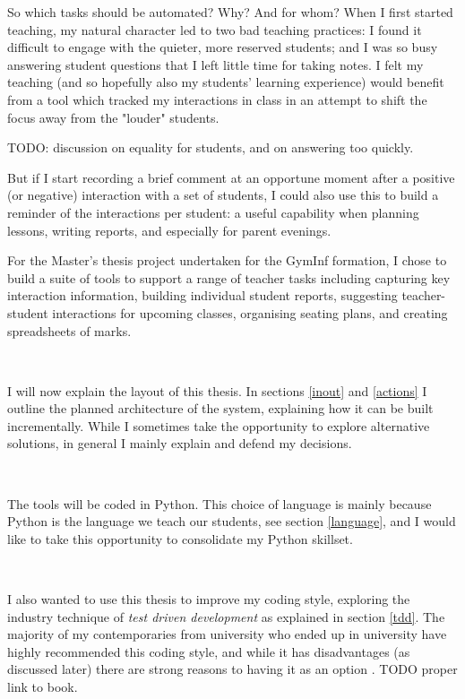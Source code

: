 \documentclass[10pt]{article}
\begin{document}
So which tasks should be automated? Why? And for whom? When I first started teaching, my natural character led to two bad teaching practices: I found it difficult to engage with the quieter, more reserved students; and I was so busy answering student questions that I left little time for taking notes. I felt my teaching (and so hopefully also my students' learning experience) would benefit from a tool which tracked my interactions in class in an attempt to shift the focus away from the "louder" students. 

TODO: discussion on equality for students, and \cite{Hat12} on answering too quickly.

But if I start recording a brief comment at an opportune moment after a positive (or negative) interaction with a set of students, I could also use this to build a reminder of the interactions per student: a useful capability when planning lessons, writing reports, and especially for parent evenings.

For the Master's thesis project undertaken for the GymInf formation, I chose to build a suite of tools to support a range of teacher tasks including capturing key interaction information, building individual student reports, suggesting teacher-student interactions for upcoming classes, organising seating plans, and creating spreadsheets of marks. 

\

I will now explain the layout of this thesis. In sections \ref{inout} and \ref{actions} I outline the planned architecture of the system, explaining how it can be built incrementally. While I sometimes take the opportunity to explore alternative solutions, in general I mainly explain and defend my decisions.

\

The tools will be coded in Python. This choice of language is mainly because Python is the language we teach our students, see section \ref{language}, and I would like to take this opportunity to consolidate my Python skillset.

\

I also wanted to use this thesis to improve my coding style, exploring the industry technique of \emph{test driven development} as explained in section \ref{tdd}. The majority of my contemporaries from university who ended up in university have highly recommended this coding style, and while it has disadvantages (as discussed later) there are strong reasons to having it as an option \cite{Amman16}. TODO proper link to book.
\end{document}
